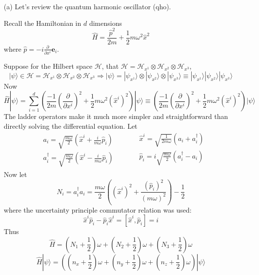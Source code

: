 \documentclass[twoside]{amsart}
\theoremstyle{plain}
\theoremstyle{definition}
\begin{document}
\begin{enumerate}
\item[(a)] Let's review the quantum harmonic oscillator (qho).  

Recall the Hamiltonian in $d$ dimensions
\[
\widehat{H} = \frac{ \widehat{p}^2}{2m} + \frac{1}{2} m \omega^2 \widehat{x}^2
\]
where $\widehat{p} = -i \frac{ \partial }{ \partial x^i} \mathbf{e}_i$.  

Suppose for the Hilbert space $\mathcal{H}$, that $\mathcal{H} = \mathcal{H}_{x^1} \otimes \mathcal{H}_{x^2} \otimes \mathcal{H}_{x^3}$, 
\[
| \psi \rangle \in \mathcal{H} = \mathcal{H}_{x^1} \otimes \mathcal{H}_{x^2} \otimes \mathcal{H}_{x^3} \Longrightarrow |\psi \rangle = | \psi_{x^1} \rangle \otimes  | \psi_{x^2} \rangle \otimes | \psi_{x^3} \rangle \equiv | \psi_{x^1} \rangle | \psi_{x^2} \rangle | \psi_{x^3} \rangle
\]
Now
\[
\widehat{H} | \psi \rangle = \sum_{i=1}^d \left( \frac{-1}{2m} \left( \frac{ \partial }{ \partial x^i} \right)^2  + \frac{1}{2} m \omega^2 (\widehat{x}^i)^2 \right) |\psi \rangle \equiv \left( \frac{-1}{2m} \left( \frac{ \partial }{ \partial x^i} \right)^2  + \frac{1}{2} m \omega^2 (\widehat{x}^i)^2 \right) |\psi \rangle
\]
The ladder operators make it much more simpler and straightforward than directly solving the differential equation.  Let
\[
\begin{aligned}
  & a_i =  \sqrt{ \frac{m\omega}{2} } \left( \widehat{x}^i + \frac{i}{m\omega} \widehat{p}_i \right) \\
  & a_i^{\dag} = \sqrt{ \frac{m\omega}{2} } \left( \widehat{x}^i - \frac{i}{m\omega} \widehat{p}_i \right)
\end{aligned} \quad \quad \, \begin{aligned}
  & \widehat{x}^i = \sqrt{ \frac{1}{2m\omega} } (a_i + a_i^{\dag}) \\ 
  & \widehat{p}_i = i \sqrt{ \frac{m \omega}{2 } } (a_i^{\dag} - a_i ) \\ 
\end{aligned}
\]
Now let 
\[
N_i = a_i^{\dag} a_i = \frac{m\omega}{2} ((\widehat{x}^i)^2 + \frac{ (\widehat{p}_i)^2}{ (m\omega)^2 } ) - \frac{1}{2}
\]
where the uncertainty principle commutator relation was used: 
\[
\widehat{x}^i \widehat{p}_i - \widehat{p}_i\widehat{x}^i = [\widehat{x}^i , \widehat{p}_i ] =  i 
\]
Thus
\[
\widehat{H} = (N_1 + \frac{1}{2} ) \omega + (N_2 + \frac{1}{2} ) \omega + (N_3 + \frac{1}{2} ) \omega
\]
\[
\widehat{H} | \psi \rangle = ((n_x + \frac{1}{2} )\omega + (n_y + \frac{1}{2}) \omega + (n_z + \frac{1}{2} ) \omega ) | \psi \rangle
\]


\end{enumerate}
\end{document}
